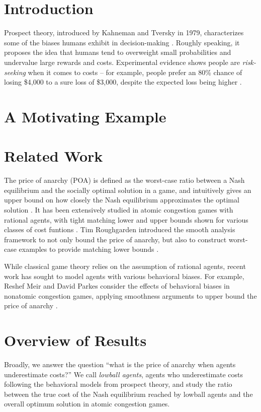 \documentclass[twoside]{article}
\begin{document}
\begin{multicols}{2} %

\section{Introduction}
Prospect theory, introduced by Kahneman and Tversky in 1979, characterizes some
of the biases humans exhibit in decision-making \cite{Kahneman1979}. Roughly
speaking, it proposes the idea that humans tend to overweight small
probabilities and undervalue large rewards and costs. Experimental evidence
shows people are \textit{risk-seeking} when it comes to costs -- for example,
people prefer an 80\% chance of losing \$4,000 to a sure loss of \$3,000,
despite the expected loss being higher \cite{Kahneman1979}.


\section{A Motivating Example}

\section{Related Work}
The price of anarchy (POA) is defined as the worst-case ratio between a Nash
equilibrium and the socially optimal solution in a game, and intuitively gives
an upper bound on how closely the Nash equilibrium approximates the optimal
solution \cite{Koutsoupias2009}. It has been extensively studied in atomic
congestion games with rational agents, with tight matching lower and upper
bounds shown for various classes of cost funtions \cite{Aland2011}
\cite{Roughgarden2012}. Tim Roughgarden introduced the smooth analysis framework
to not only bound the price of anarchy, but also to construct worst-case
examples to provide matching lower bounds \cite{Roughgarden2012}.

While classical game theory relies on the assumption of rational agents, recent
work has sought to model agents with various behavioral biases. For example,
Reshef Meir and David Parkes consider the effects of behavioral biases in
nonatomic congestion games, applying smoothness arguments to upper bound the
price of anarchy \cite{Meir2014}.

\section{Overview of Results}
Broadly, we answer the question ``what is the price of anarchy when agents
underestimate costs?'' We call \textit{lowball agents}, agents who underestimate
costs following the behavioral models from prospect theory, and study the ratio between the true cost of the Nash equilibrium reached by lowball agents and the overall optimum solution in atomic congestion games.


\end{multicols}
\end{document}
